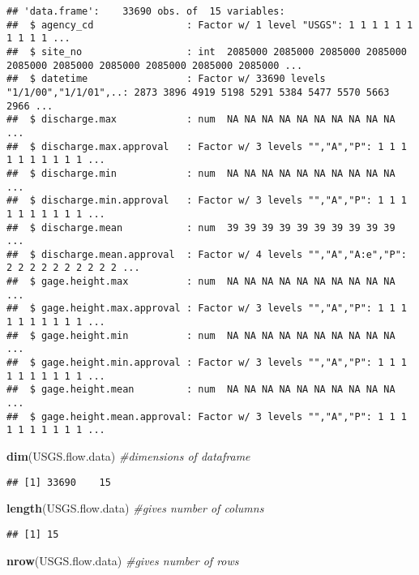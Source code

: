 \documentclass[]{article}
\newenvironment{Shaded}{\begin{snugshade}}{\end{snugshade}}
\newcommand{\CommentTok}[1]{\textcolor[rgb]{0.56,0.35,0.01}{\textit{#1}}}
\newcommand{\KeywordTok}[1]{\textcolor[rgb]{0.13,0.29,0.53}{\textbf{#1}}}
\newcommand{\NormalTok}[1]{#1}
\begin{document}
\begin{verbatim}
## 'data.frame':    33690 obs. of  15 variables:
##  $ agency_cd                : Factor w/ 1 level "USGS": 1 1 1 1 1 1 1 1 1 1 ...
##  $ site_no                  : int  2085000 2085000 2085000 2085000 2085000 2085000 2085000 2085000 2085000 2085000 ...
##  $ datetime                 : Factor w/ 33690 levels "1/1/00","1/1/01",..: 2873 3896 4919 5198 5291 5384 5477 5570 5663 2966 ...
##  $ discharge.max            : num  NA NA NA NA NA NA NA NA NA NA ...
##  $ discharge.max.approval   : Factor w/ 3 levels "","A","P": 1 1 1 1 1 1 1 1 1 1 ...
##  $ discharge.min            : num  NA NA NA NA NA NA NA NA NA NA ...
##  $ discharge.min.approval   : Factor w/ 3 levels "","A","P": 1 1 1 1 1 1 1 1 1 1 ...
##  $ discharge.mean           : num  39 39 39 39 39 39 39 39 39 39 ...
##  $ discharge.mean.approval  : Factor w/ 4 levels "","A","A:e","P": 2 2 2 2 2 2 2 2 2 2 ...
##  $ gage.height.max          : num  NA NA NA NA NA NA NA NA NA NA ...
##  $ gage.height.max.approval : Factor w/ 3 levels "","A","P": 1 1 1 1 1 1 1 1 1 1 ...
##  $ gage.height.min          : num  NA NA NA NA NA NA NA NA NA NA ...
##  $ gage.height.min.approval : Factor w/ 3 levels "","A","P": 1 1 1 1 1 1 1 1 1 1 ...
##  $ gage.height.mean         : num  NA NA NA NA NA NA NA NA NA NA ...
##  $ gage.height.mean.approval: Factor w/ 3 levels "","A","P": 1 1 1 1 1 1 1 1 1 1 ...
\end{verbatim}

\begin{Shaded}
\begin{Highlighting}[]
\KeywordTok{dim}\NormalTok{(USGS.flow.data) }\CommentTok{#dimensions of dataframe}
\end{Highlighting}
\end{Shaded}

\begin{verbatim}
## [1] 33690    15
\end{verbatim}

\begin{Shaded}
\begin{Highlighting}[]
\KeywordTok{length}\NormalTok{(USGS.flow.data) }\CommentTok{#gives number of columns}
\end{Highlighting}
\end{Shaded}

\begin{verbatim}
## [1] 15
\end{verbatim}

\begin{Shaded}
\begin{Highlighting}[]
\KeywordTok{nrow}\NormalTok{(USGS.flow.data) }\CommentTok{#gives number of rows}
\end{Highlighting}
\end{Shaded}
\end{document}
